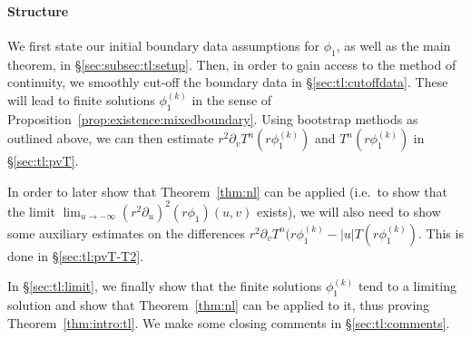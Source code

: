 \documentclass[11pt,english]{article}
\numberwithin{equation}{section}
\theoremstyle{remark}
\theoremstyle{plain}
\theoremstyle{remark}
\newcommand{\pu}{\partial_u}
\newcommand{\pv}{\partial_v}
\renewcommand{\(}{\left(}
\renewcommand{\)}{\right)}
\newcommand{\pho}{(r\phi_1)}
\begin{document}

%

\paragraph*{Structure}
We first state our initial boundary data assumptions for $\phi_1$, as well as the main theorem, in \S \ref{sec:subsec:tl:setup}. 
Then, in order to gain access to the method of continuity, we smoothly cut-off the boundary data in \S \ref{sec:tl:cutoffdata}. 
These will lead to finite solutions $\phi_1^{(k)}$ in the sense of Proposition~\ref{prop:existence:mixedboundary}.
Using bootstrap methods as outlined above, we can then estimate $r^2\pv T^n(r\phi_1^{(k)})$ and $T^n(r\phi_1^{(k)})$ in \S \ref{sec:tl:pvT}. 

In order to later show that Theorem~\ref{thm:nl} can be applied (i.e.\ to show that the limit $\lim_{u\to-\infty}(r^2\pu)^2(r\phi_1)(u,v)$ exists), we will also need to show some auxiliary estimates on the differences $r^2\pv T^n(r\phi_1^{(k)}-|u|T(r\phi_1^{(k)})$. This is done in \S \ref{sec:tl:pvT-T2}. 

In \S \ref{sec:tl:limit}, we finally show that the finite solutions $\phi_1^{(k)}$ tend to a limiting solution and show that Theorem~\ref{thm:nl} can be applied to it, thus proving Theorem~\ref{thm:intro:tl}. 
We  make some closing comments in \S \ref{sec:tl:comments}.
\end{document}
